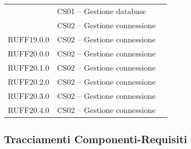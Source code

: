 \begin{center}
\begin{longtable}{lp{}l}
 & CS01 -- Gestione database \\
 & CS02 -- Gestione connessione \\
RUFF19.0.0 & CS02 -- Gestione connessione \\
RUFF20.0.0 & CS02 -- Gestione connessione \\
RUFF20.1.0 & CS02 -- Gestione connessione \\
RUFF20.2.0 & CS02 -- Gestione connessione \\
RUFF20.3.0 & CS02 -- Gestione connessione \\
RUFF20.4.0 & CS02 -- Gestione connessione \\
\bottomrule
\end{longtable}
\end{center}
\subsection{Tracciamenti Componenti-Requisiti}\label{sec:tracCompRec}

